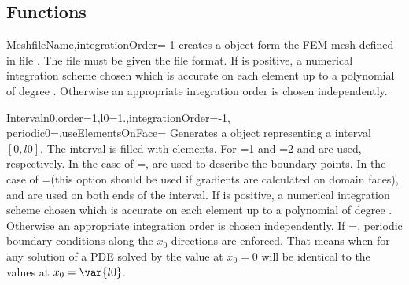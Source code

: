 \subsection{Functions}
\begin{funcdesc}{Mesh}{fileName,integrationOrder=-1}
creates a \Domain object form the FEM mesh defined in 
file . The file must be given the \finley file format.
If  is positive, a numerical integration scheme
chosen which is accurate on each element up to a polynomial of
degree  . Otherwise
an appropriate integration order is chosen independently.
\end{funcdesc}

\begin{funcdesc}{Interval}{n0,order=1,l0=1.,integrationOrder=-1, \\
  periodic0=\False,useElementsOnFace=\False}
Generates a \Domain object representing a interval $[0,l0]$. The interval is filled with
 elements. 
For =1 and =2
 and  
 are used, respectively. 
In the case of =\False,
 are used to describe the boundary points. 
In the case of =\True (this option should be used if gradients
are calculated on domain faces),
 and  
 are used on both ends of the interval.  
If  is positive, a numerical integration scheme
chosen which is accurate on each element up to a polynomial of
degree  . Otherwise
an appropriate integration order is chosen independently. If
=\True, periodic boundary conditions 
along the $x_0$-directions are enforced. That means when for any solution of a PDE solved by \finley
the value at $x_0=0$ will be identical to the values at $x_0=\var{l0}$.
\end{funcdesc}

